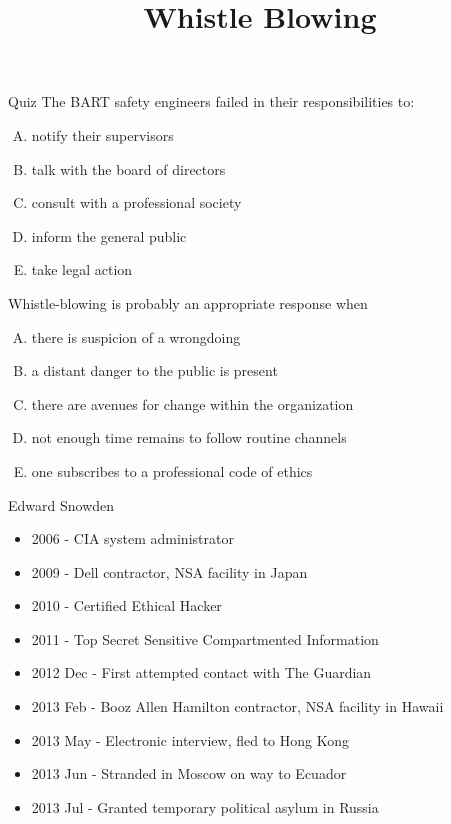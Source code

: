 \documentclass{beamer}
\title{Whistle Blowing}
\date{}
\begin{document}
\begin{frame}
\titlepage
\end{frame}

\begin{frame}{Quiz}
The BART safety engineers failed in their responsibilities to:
\begin{enumerate}[(A)]
\item<1> notify their supervisors
\item<1> talk with the board of directors
\item<1> consult with a professional society
\item<1-2> inform the general public %
\item<1> take legal action
\end{enumerate}
\bigskip
Whistle-blowing is probably an appropriate response when
\begin{enumerate}[(A)]
\item<1> there is suspicion of a wrongdoing
\item<1> a distant danger to the public is present
\item<1> there are avenues for change within the organization
\item<1-2> not enough time remains to follow routine channels
\item<1> one subscribes to a professional code of ethics
\end{enumerate}
\end{frame}

\begin{frame}{Edward Snowden}
\begin{itemize}
\item 2006 - CIA system administrator
\item 2009 - Dell contractor, NSA facility in Japan
\item 2010 - Certified Ethical Hacker
\item 2011 - Top Secret Sensitive Compartmented Information
\item 2012 Dec - First attempted contact with The Guardian
\item 2013 Feb - Booz Allen Hamilton contractor, NSA facility in Hawaii
\item 2013 May - Electronic interview, fled to Hong Kong
\item 2013 Jun - Stranded in Moscow on way to Ecuador
\item 2013 Jul - Granted temporary political asylum in Russia
\end{itemize}
\end{frame}
\end{document}
